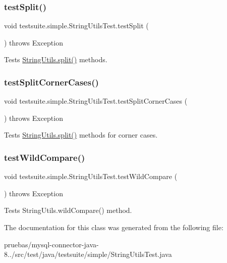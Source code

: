 \subsubsection{\texorpdfstring{test\+Split()}{testSplit()}}
{\footnotesize\ttfamily void testsuite.\+simple.\+String\+Utils\+Test.\+test\+Split (\begin{DoxyParamCaption}{ }\end{DoxyParamCaption}) throws Exception}

Tests \mbox{\hyperlink{classcom_1_1mysql_1_1cj_1_1util_1_1_string_utils_a7415fcd4dc83631e7840f2784c2332f9}{String\+Utils.\+split()}} methods. \mbox{\label{classtestsuite_1_1simple_1_1_string_utils_test_a99205fb8cc261bc7c1bb4968a0cca52a}} 
\subsubsection{\texorpdfstring{test\+Split\+Corner\+Cases()}{testSplitCornerCases()}}
{\footnotesize\ttfamily void testsuite.\+simple.\+String\+Utils\+Test.\+test\+Split\+Corner\+Cases (\begin{DoxyParamCaption}{ }\end{DoxyParamCaption}) throws Exception}

Tests \mbox{\hyperlink{classcom_1_1mysql_1_1cj_1_1util_1_1_string_utils_a7415fcd4dc83631e7840f2784c2332f9}{String\+Utils.\+split()}} methods for corner cases. \mbox{\label{classtestsuite_1_1simple_1_1_string_utils_test_a2c88f5e437abcdfdb41c193ff8eb2841}} 
\subsubsection{\texorpdfstring{test\+Wild\+Compare()}{testWildCompare()}}
{\footnotesize\ttfamily void testsuite.\+simple.\+String\+Utils\+Test.\+test\+Wild\+Compare (\begin{DoxyParamCaption}{ }\end{DoxyParamCaption}) throws Exception}

Tests String\+Utils.\+wild\+Compare() method. 

The documentation for this class was generated from the following file\+:\begin{DoxyCompactItemize}
\item 
pruebas/mysql-\/connector-\/java-\/8../src/test/java/testsuite/simple/String\+Utils\+Test.\+java\end{DoxyCompactItemize}
